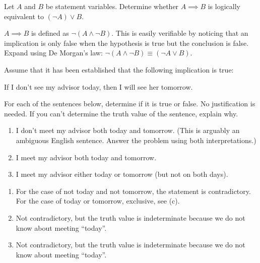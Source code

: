 \begin{recommended}
  Let $A$ and $B$ be statement variables.
  Determine whether $A \implies B$ is logically equivalent to $(\lnot A) \lor B$.
\end{recommended}
\begin{prf}
  $A \implies B$ is defined as $\lnot(A \land \lnot B)$.
  This is easily verifiable by noticing that an implication is only false when the hypothesis is true but the conclusion is false.
  Expand using De Morgan's law: $\lnot(A \land \lnot B) \equiv (\lnot A \lor B)$.
\end{prf}


\begin{recommended}
  Assume that it has been established that the following implication is true:
  \begin{center}
    If I don't see my advisor today, then I will see her tomorrow.
  \end{center}
  For each of the sentences below, determine if it is true or false. No justification is needed.
  If you can't determine the truth value of the sentence, explain why.
  \begin{enumerate}
    \item I don't meet my advisor both today and tomorrow. (This is arguably an ambiguous English sentence. Answer the problem using both interpretations.)
    \item I meet my advisor both today and tomorrow.
    \item I meet my advisor either today or tomorrow (but not on both days).
  \end{enumerate}
\end{recommended}
\begin{sol}
  \begin{enumerate}
    \item For the case of not today and not tomorrow, the statement is contradictory.
          For the case of today or tomorrow, exclusive, see (c).
    \item Not contradictory, but the truth value is indeterminate because we do not know about meeting ``today''.
    \item Not contradictory, but the truth value is indeterminate because we do not know about meeting ``today''.
          \qedhere
  \end{enumerate}
\end{sol}

